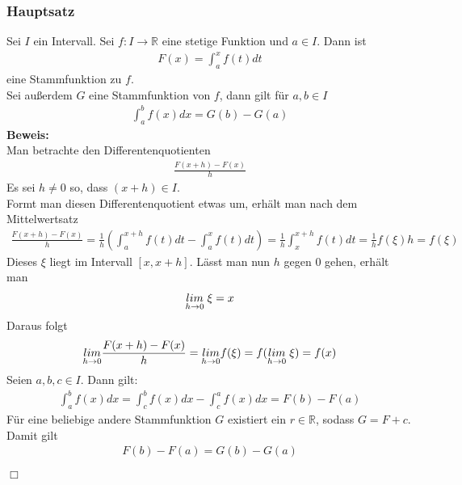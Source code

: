\documentclass[a4paper]{article}
\begin{document}
\subsubsection{Hauptsatz}
Sei $I$ ein Intervall. Sei $f: I \rightarrow \mathbb{R}$ eine stetige Funktion und $a \in I$. Dann ist 
\begin{align*}
F(x) = \int_a^x f(t) dt
\end{align*}
eine Stammfunktion zu $f$. \vspace{1em} \\
Sei außerdem $G$ eine Stammfunktion von $f$, dann gilt für $a,b \in I$
\begin{align*}
\int_a^b f(x) dx = G(b) - G(a)
\end{align*}
\textbf{Beweis:} \\
Man betrachte den Differentenquotienten
\begin{align*}
\frac{F(x+h) - F(x)}{h}
\end{align*}
Es sei $h \neq 0$ so, dass $(x+h) \in I$. \\
Formt man diesen Differentenquotient etwas um, erhält man nach dem Mittelwertsatz
\begin{align*}
\frac{F(x+h) - F(x)}{h} = \frac{1}{h} \left( \int_a^{x+h} f(t) dt - \int_a^x f(t) dt \right) = \frac{1}{h} \int_x^{x+h} f(t) dt = \frac{1}{h} f(\xi)h = f(\xi)
\end{align*}
Dieses $\xi$ liegt im Intervall $[x,x+h]$. Lässt man nun $h$ gegen $0$ gehen, erhält man 
\begin{align*}
\underset{h \rightarrow 0}{lim} \hspace{0.1 cm}\xi = x
\end{align*}
Daraus folgt
\begin{align*}
\underset{h \rightarrow 0}{lim} \frac{F(x+h) - F(x)}{h} = \underset{h \rightarrow 0}{lim} f(\xi) = f(\underset{h \rightarrow 0}{lim} \hspace{0.1 cm} \xi) = f(x)
\end{align*}
Seien $a,b,c \in I$. Dann gilt: 
\begin{align*}
\int_a^b f(x) dx = \int_c^b f(x) dx - \int_c^a f(x) dx = F(b) - F(a)
\end{align*}
Für eine beliebige andere Stammfunktion $G$ existiert ein $r \in \mathbb{R}$, sodass $G = F+c$. Damit gilt
\begin{align*}
F(b) - F(a) = G(b) - G(a)
\end{align*}
\begin{flushright}
$\Box$
\end{flushright}
\end{document}

